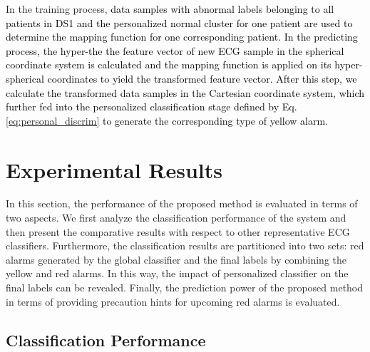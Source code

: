 In the training process, \textcolor{black}{data samples with abnormal labels belonging to all patients in DS1 and the personalized normal cluster for one patient are used to determine the mapping function for one corresponding patient. In the predicting process, the hyper-the the feature vector of new ECG sample in the spherical coordinate system is calculated and the mapping function is applied on its hyper-spherical coordinates to yield the transformed feature vector. After this step, we calculate the transformed data samples in the Cartesian coordinate system, which further fed into the personalized classification stage defined by Eq. \ref{eq:personal_discrim} to generate the corresponding type of yellow alarm.} %



\section{Experimental Results}\label{sec:result_spatial}

In this section, the performance of the proposed method is evaluated in terms of two aspects. We first analyze the classification performance of the system and then present the comparative results with respect to other representative ECG classifiers. Furthermore, the classification results are partitioned into two sets:  red alarms generated by the global classifier and the final labels by combining the yellow and red alarms. In this way, the impact of personalized classifier on the final labels can be revealed. Finally, the prediction power of the proposed method in terms of providing precaution hints for upcoming red alarms is evaluated.

\subsection{Classification Performance}

